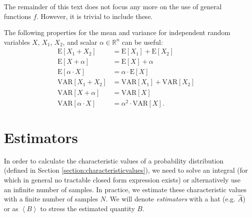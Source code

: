 \documentclass[10pt,a4paper]{article}
\numberwithin{equation}{section}
\begin{document}
The remainder of this text does not focus any more on the use of general functions $f$. However, it is trivial to include these.

The following properties for the mean and variance for independent random variables $X$, $X_{1}$, $X_{2}$, and scalar $\alpha \in \mathbb{R}^{n}$ can be useful:
\begin{align}
\mathrm{E}\left[X_{1} + X_{2}\right] 		&= \mathrm{E}\left[X_{1}\right] + \mathrm{E}\left[X_{2}\right] \\
\mathrm{E}\left[X + \alpha\right] 			&= \mathrm{E}\left[X\right] +\alpha \\
\mathrm{E}\left[\alpha \cdot X\right] 		&= \alpha \cdot \mathrm{E}\left[X\right] \\
\mathrm{VAR}\left[X_{1} + X_{2}\right] 		&= \mathrm{VAR}\left[X_{1}\right] + \mathrm{VAR}\left[X_{2}\right] \\
\mathrm{VAR}\left[X + \alpha\right] 		&= \mathrm{VAR}\left[X\right]\\
\mathrm{VAR}\left[\alpha \cdot X\right] 	&= \alpha^{2} \cdot \mathrm{VAR}\left[X\right].
\end{align}

\section{Estimators}
\label{section-estimators}
In order to calculate the characteristic values of a probability distribution (defined in Section \ref{section:characteristicvalues}), we need to solve an integral (for which in general no tractable closed form expression exists) or alternatively use an infinite number of samples. In practice, we estimate these characteristic values with a finite number of samples $N$. We will denote \textit{estimators} with a hat (e.g. $\widehat{A}$) or as $\left<B\right>$ to stress the estimated quantity $B$.
\end{document}
